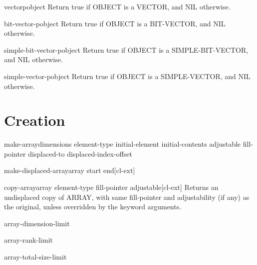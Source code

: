 \documentclass[10pt,english]{book}
\begin{document}
\begin{function}{vectorp}{object}
  Return true if OBJECT is a VECTOR, and NIL otherwise.
\end{function}

\begin{function}{bit-vector-p}{object}
  Return true if OBJECT is a BIT-VECTOR, and NIL otherwise.
\end{function}

\begin{function}{simple-bit-vector-p}{object}
  Return true if OBJECT is a SIMPLE-BIT-VECTOR, and NIL otherwise.
\end{function}

\begin{function}{simple-vector-p}{object}
  Return true if OBJECT is a SIMPLE-VECTOR, and NIL otherwise.
\end{function}

\section{Creation}
\label{sec:array-creation}

\begin{function}{make-array}{dimensions \key element-type initial-element initial-contents adjustable
 fill-pointer displaced-to displaced-index-offset}
  
\end{function}

\begin{function}{make-displaced-array}{array \op start end}[cl-ext]
  
\end{function}

\begin{function}{copy-array}{array \key element-type fill-pointer adjustable}[cl-ext]
  Returns an undisplaced copy of ARRAY, with same fill-pointer
and adjustability (if any) as the original, unless overridden by
the keyword arguments.
\end{function}

\begin{constant}{array-dimension-limit}{}
  
\end{constant}

\begin{constant}{array-rank-limit}{}
  
\end{constant}

\begin{constant}{array-total-size-limit}{}
  
\end{constant}
\end{document}
